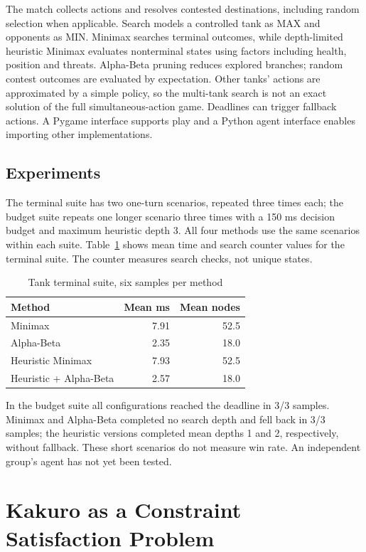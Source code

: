 \documentclass[conference]{IEEEtran}
\begin{document}
The match collects actions and resolves contested destinations, including random selection when applicable. Search models a controlled tank as MAX and opponents as MIN. Minimax searches terminal outcomes, while depth-limited heuristic Minimax evaluates nonterminal states using factors including health, position and threats. Alpha-Beta pruning reduces explored branches; random contest outcomes are evaluated by expectation. Other tanks' actions are approximated by a simple policy, so the multi-tank search is not an exact solution of the full simultaneous-action game. Deadlines can trigger fallback actions. A Pygame interface supports play and a Python agent interface enables importing other implementations.
\subsection{Experiments}
The terminal suite has two one-turn scenarios, repeated three times each; the budget suite repeats one longer scenario three times with a 150 ms decision budget and maximum heuristic depth 3. All four methods use the same scenarios within each suite. Table~\ref{tank} shows mean time and search counter values for the terminal suite. The counter measures search checks, not unique states.
\begin{table}[htbp]\caption{Tank terminal suite, six samples per method}\label{tank}\centering
    \begin{tabular}{lrr}\hline Method & Mean ms & Mean nodes \\\hline
                   Minimax            & 7.91    & 52.5       \\Alpha-Beta & 2.35 & 18.0\\Heuristic Minimax & 7.93 & 52.5\\Heuristic + Alpha-Beta & 2.57 & 18.0\\\hline\end{tabular}\end{table}
In the budget suite all configurations reached the deadline in 3/3 samples. Minimax and Alpha-Beta completed no search depth and fell back in 3/3 samples; the heuristic versions completed mean depths 1 and 2, respectively, without fallback. These short scenarios do not measure win rate. An independent group's agent has not yet been tested.
\section{Kakuro as a Constraint Satisfaction Problem}
\end{document}
